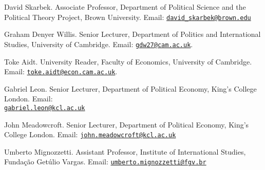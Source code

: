 \documentclass[a4paper]{article}
\renewenvironment{itemize}{
  \begin{list}{}{
    \setlength{\leftmargin}{1.5em}
  }
}{
  \end{list}
}
\begin{document}
\begin{itemize}
	\item David Skarbek. Associate Professor, Department of Political Science and the Political Theory Project, Brown University. Email: \href{mailto:davidskarbek@gmail.com}{\texttt{david\_skarbek@brown.edu}}
	\item Graham Denyer Willis. Senior Lecturer, Department of Politics and International Studies, University of Cambridge. Email: \href{mailto:gdw27@cam.ac.uk}{\texttt{gdw27@cam.ac.uk}}.
	\item Toke Aidt. University Reader, Faculty of Economics, University of Cambridge. Email: \href{mailto:toke.aidt@econ.cam.ac.uk}{\texttt{toke.aidt@econ.cam.ac.uk}}.
	\item Gabriel Leon. Senior Lecturer, Department of Political Economy, King's College London. Email: \\ \href{mailto:gabriel.leon@kcl.ac.uk}{\texttt{gabriel.leon@kcl.ac.uk}}
	\item John Meadowcroft. Senior Lecturer, Department of Political Economy, King's College London. Email: \href{mailto:john.meadowcroft@kcl.ac.uk}{\texttt{john.meadowcroft@kcl.ac.uk}}
	\item Umberto Mignozzetti. Assistant Professor, Institute of International Studies, Funda\c{c}\~{a}o Get\'{u}lio Vargas. Email: \href{umberto.mignozzetti@fgv.br}{\texttt{umberto.mignozzetti@fgv.br}}
\end{itemize}

\bigskip
\end{document}
